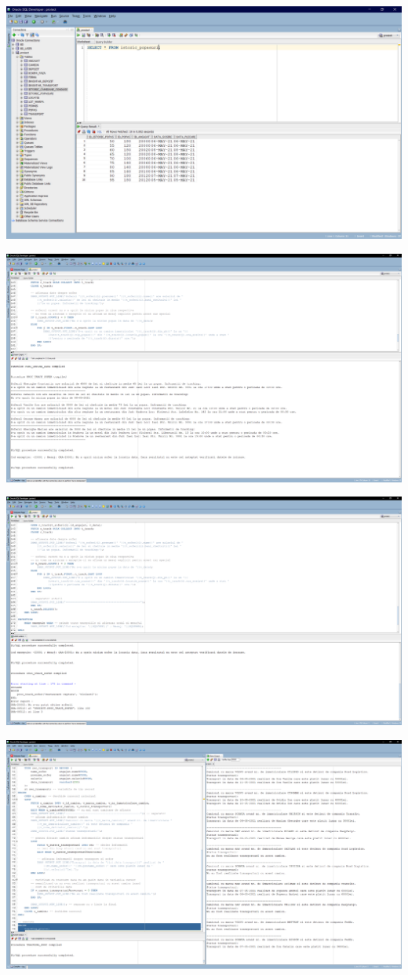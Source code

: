 \documentclass[12pt, a4paper]{article}
\begin{document}
\includegraphics[width=\textwidth]{date_tabel_ist_pop.png}

\includegraphics[width=\textwidth]{6_1.png}

\includegraphics[width=\textwidth]{6_2.png}

\includegraphics[width=\textwidth]{7_1.png}
\end{document}
